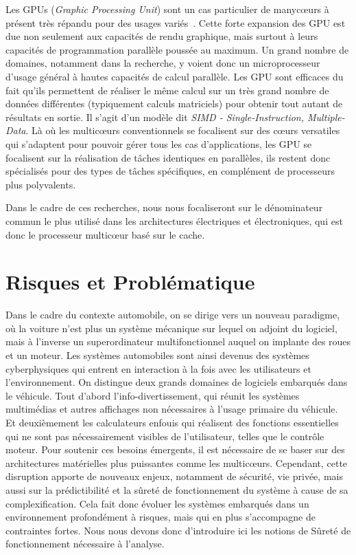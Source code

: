 \documentclass[french, a4paper, 11pt, twoside, pdftex]{StyleThese}
\begin{document}
		Les GPUs (\emph{Graphic Processing Unit}) sont un cas particulier de manycœurs à présent très répandu pour des usages variés~\cite{owens_gpu_2008}. Cette forte expansion des GPU est due non seulement aux capacités de rendu graphique, mais surtout à leurs capacités de programmation parallèle poussée au maximum. Un grand nombre de domaines, notamment dans la recherche, y voient donc un microprocesseur d'usage général à hautes capacités de calcul parallèle.
		Les GPU sont efficaces du fait qu'ils permettent de réaliser le même calcul sur un très grand nombre de données différentes (typiquement calculs matriciels) pour obtenir tout autant de résultats en sortie. Il s'agit d'un modèle dit \emph{SIMD - Single-Instruction, Multiple-Data}. Là où les multicœurs conventionnels se focalisent sur des cœurs versatiles qui s'adaptent pour pouvoir gérer tous les cas d'applications, les GPU se focalisent sur la réalisation de tâches identiques en parallèles, ils restent donc spécialisés pour des types de tâches spécifiques, en complément de processeurs plus polyvalents.
		
		Dans le cadre de ces recherches, nous nous focaliseront sur le dénominateur commun le plus utilisé dans les architectures électriques et électroniques, qui est donc le processeur multicœur basé sur le cache.
		
\section{Risques et Problématique}
	Dans le cadre du contexte automobile, on se dirige  vers un nouveau paradigme, où la voiture n'est plus un système mécanique sur lequel on adjoint du logiciel, mais à l'inverse un superordinateur multifonctionnel auquel on implante des roues et un moteur. 
	Les systèmes automobiles sont ainsi devenus des systèmes cyberphysiques qui entrent en interaction à la fois avec les utilisateurs et l'environnement. On distingue deux grands domaines de logiciels embarqués dans le véhicule. Tout d'abord l'info-divertissement, qui réunit les systèmes multimédias et autres affichages non nécessaires à l'usage primaire du véhicule. Et deuxièmement les calculateurs enfouis qui réalisent des fonctions essentielles qui ne sont pas nécessairement visibles de l'utilisateur, telles que le contrôle moteur. Pour soutenir ces besoins émergents, il est nécessaire de se baser sur des architectures matérielles plus puissantes comme les multicœurs. Cependant, cette disruption apporte de nouveaux enjeux, notamment de sécurité, vie privée, mais aussi sur la prédictibilité et la sûreté de fonctionnement du système à cause de sa complexification. Cela fait donc évoluer les systèmes embarqués dans un environnement profondément à risques, mais qui en plus s'accompagne de contraintes fortes. Nous nous devons donc d'introduire ici les notions de Sûreté de fonctionnement nécessaire à l'analyse.
\end{document}
